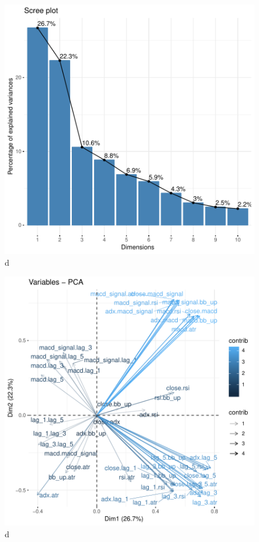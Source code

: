 \documentclass[a4paper,12pt]{Latex/Classes/PhDthesisPSnPDF}
\begin{document}
\begin{figure}[H]
\centering
\includegraphics{main-008}
\caption{d}
\end{figure}

\begin{figure}[H]
\centering
\includegraphics{main-009}
\caption{d}
\end{figure}
\end{document}
